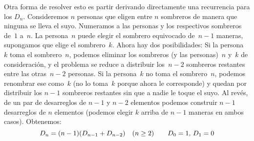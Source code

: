   Otra forma de resolver esto es partir derivando directamente
  una recurrencia para los \(D_n\).%
  Consideremos \(n\) personas
  que eligen entre \(n\) sombreros
  de manera que ninguna se lleva el suyo.
  Numeramos a las personas
  y los respectivos sombreros de~\(1\) a~\(n\).
  La persona~\(n\)
  puede elegir el sombrero equivocado de~\(n - 1\) maneras,
  supongamos que elige el sombrero~\(k\).
  Ahora hay dos posibilidades:
  Si la persona~\(k\) toma el sombrero~\(n\),
  podemos eliminar los sombreros
  (y las personas)~\(n\) y~\(k\) de consideración,
  y el problema se reduce a distribuir
  los~\(n - 2\) sombreros restantes
  entre las otras~\(n - 2\) personas.
  Si la persona~\(k\) no toma el sombrero~\(n\),
  podemos renombrar ese como~\(k\)
  (no lo toma~\(k\) porque ahora le corresponde)
  y quedan por distribuir los \(n - 1\) sombreros restantes
  sin que a nadie le toque el suyo.
  Al revés,
  de un par de desarreglos de \(n - 1\) y \(n - 2\) elementos
  podemos construir \(n - 1\) desarreglos de \(n\) elementos
  (podemos elegir \(k\) arriba de \(n - 1\) maneras en ambos casos).
  Obtenemos:
  \begin{equation}
    \label{eq:recurrence-desarreglos}
    D_n
      = (n - 1) (D_{n - 1} + D_{n - 2})
    \quad (n \ge 2)
    \qquad \text{\(D_0 = 1\), \(D_1 = 0\)}
    \index{desarreglo!recurrencia}
  \end{equation}

